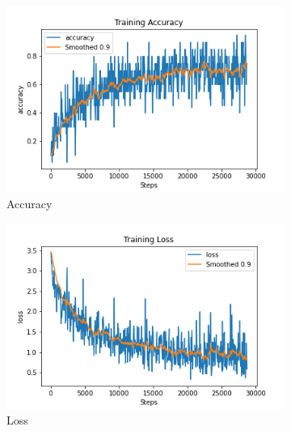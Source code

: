 \begin{figure}[h]
     \centering
     \begin{subfigure}[b]{0.3\textwidth}
         \centering
         \includegraphics[width=\textwidth]{./figure/results/baseline_and_blindfolding/training/accuracy.png}
         \caption{Accuracy}
         \label{fig:training_accuracy}
     \end{subfigure}
     \hfill
     \begin{subfigure}[b]{0.3\textwidth}
         \centering
         \includegraphics[width=\textwidth]{./figure/results/baseline_and_blindfolding/training/loss.png}
         \caption{Loss}
         \label{fig:training_loss}
     \end{subfigure}
     \hfill
     \begin{subfigure}[b]{0.3\textwidth}
         \centering

\end{subfigure}
\end{figure}
